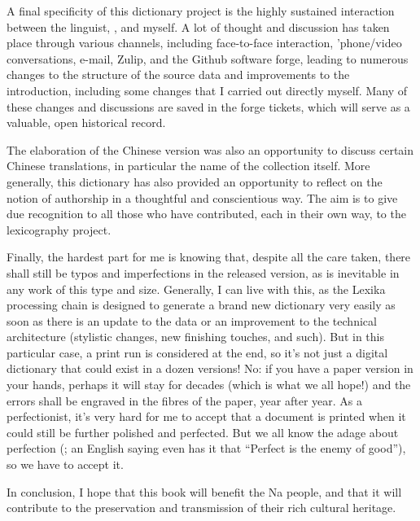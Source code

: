 A final specificity of this dictionary project is the highly sustained interaction between the linguist, \alexisfra, and myself. A lot of thought and discussion has taken place through various channels, including face-to-face interaction, ’phone/video conversations, e-mail, Zulip, and the Github software forge, leading to numerous changes to the structure of the source data and improvements to the introduction, including some changes that I carried out directly myself. Many of these changes and discussions are saved in the forge tickets, which will serve as a valuable, open historical record.

The elaboration of the Chinese version was also an opportunity to discuss certain Chinese translations, in particular the name of the collection itself. More generally, this dictionary has also provided an opportunity to reflect on the notion of authorship in a thoughtful and conscientious way. The aim is to give due recognition to all those who have contributed, each in their own way, to the lexicography project.

Finally, the hardest part for me is knowing that, despite all the care taken, there shall still be typos and imperfections in the released version, as is inevitable in any work of this type and size. Generally, I can live with this, as the Lexika processing chain is designed to generate a brand new dictionary very easily as soon as there is an update to the data or an improvement to the technical architecture (stylistic changes, new finishing touches, and such). But in this particular case, a print run is considered at the end, so it's not just a digital dictionary that could exist in a dozen versions! No: if you have a paper version in your hands, perhaps it will stay for decades (which is what we all hope!) and the errors shall be engraved in the fibres of the paper, year after year. As a perfectionist, it's very hard for me to accept that a document is printed when it could still be further polished and perfected. But we all know the adage about perfection (; an English saying even has it that “Perfect is the enemy of good”), so we have to accept it.

In conclusion, I hope that this book will benefit the Na people, and that it will contribute to the preservation and transmission of their rich cultural heritage.

\bigskip

\hfill \benjaminfra
